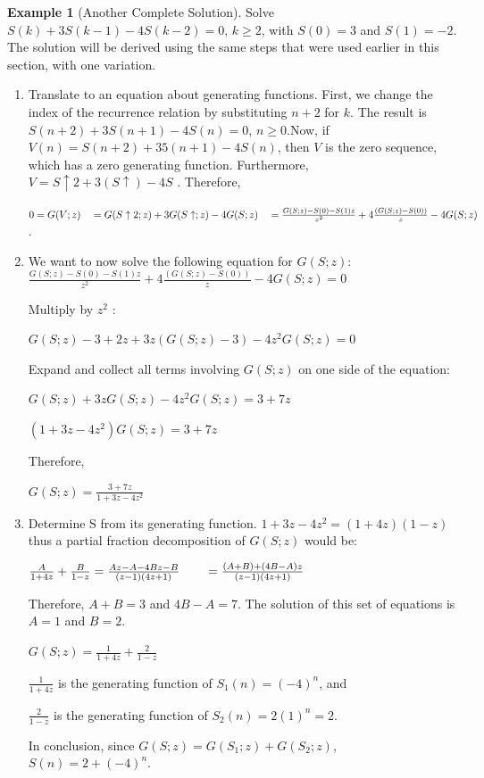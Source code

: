 \documentclass[10pt,]{book}
\theoremstyle{plain}
\theoremstyle{definition}
\theoremstyle{definition}
\theoremstyle{definition}
\newtheorem{example}[theorem]{Example}
\theoremstyle{definition}
\numberwithin{equation}{section}
\begin{document}
\begin{example}[Another Complete Solution]\label{ex-another-complete-solution}
 Solve \(S(k) + 3S(k - 1) - 4S(k -2) = 0\), \(k\geq 2\), with \(S(0) = 3\) and \(S(1) = -2\). The solution will be derived using the same steps that were used earlier in this section, with one variation.%
\par
\leavevmode%
\begin{enumerate}[label=\arabic*]
\item\hypertarget{li-154}{}Translate to an equation about generating functions. First, we change the index of the recurrence relation by substituting \(n + 2\) for \(k\).
The result is \(S(n + 2) + 3S(n + 1) - 4S(n) = 0\), \(n \geq  0\).Now, if \(V(n) = S(n + 2) + 35 (n + 1) - 4S(n)\), then \(V\) is the zero
sequence, which has a zero generating function. Furthermore, \(V = S\uparrow 2+3(S\uparrow )-4 S\) . Therefore,

\(0 = G(V;z) \\
\\
\quad = G(S\uparrow 2; z) + 3 G(S\uparrow ;z) - 4G(S;z) \\
\\
\quad = \frac{G(S;z) - S(0) - S(1)z }{z^2}+4 \frac{(G(S;z) - S(0))}{z} - 4G(S;z)\).%
\item\hypertarget{li-155}{}We want to now solve the following equation for \(G(S;z)\):
 \(\frac{G(S;z) - S(0) - S(1)z }{z^2}+4 \frac{(G(S;z) - S(0))}{z} - 4G(S;z) = 0\)

Multiply by \(z^2\) :

\(G(S;z) - 3 + 2z + 3z(G(S;z) - 3) - 4z^2 G(S;z) = 0\)

Expand and collect all terms involving \(G(S;z)\) on one side of the equation:

\(G(S;z) + 3z G(S;z) - 4z^2 G(S;z) = 3 + 7z\) 

\(\left(1 + 3z - 4z^2 \right)G(S;z)= 3 + 7z\) 

Therefore,

\(G(S;z)= \frac{3+7z}{1 + 3z - 4z^2}\)%
\item\hypertarget{li-156}{} Determine S from its generating function.
 \(1 + 3z - 4z^2 = (1 + 4z) (1 - z)\)
thus a partial fraction decomposition of \(G(S;z)\) would be:

\(\frac{A}{1+4z}+ \frac{B}{1-z}=\frac{A z-A-4 B z-B}{(z-1) (4 z+1)}\\
\\
\quad \quad =\frac{(A+B)+(4B-A)z}{(z-1) (4 z+1)}\)

Therefore, \(A + B = 3\) and \(4B - A = 7\). The solution of this set of equations is \(A = 1\) and \(B = 2\).

\(G(S;z)= \frac{1}{1+4z}+ \frac{2}{1-z}\)

\(\frac{1}{1+4z}\) is the generating function of \(S_1(n)=(-4)^n\), and

\(\frac{2}{1-z}\) is the generating function of \(S_2(n) = 2(1)^n = 2\).

In conclusion, since \(G(S;z) = G\left(S_1;z\right) + G\left(S _2;z\right)\), \(S(n) = 2 + (-4)^n\).
%
\end{enumerate}
%
\end{example}
\end{document}
